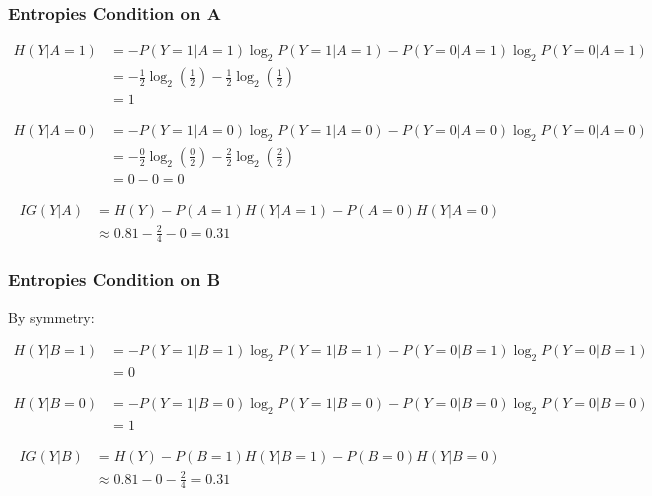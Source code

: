 \documentclass[aspectratio=169, 10pt]{beamer}
\begin{document}
\begin{frame}
\frametitle{Entropies Condition on A}
\small

\[
    \begin{split}
        H(Y | A=1) & = -P(Y=1 | A=1) \log_2 P(Y=1 | A=1) -P(Y=0 | A=1) \log_2 P(Y=0 | A=1) \\
                   & = -\frac{1}{2} \log_2(\frac{1}{2}) -\frac{1}{2} \log_2(\frac{1}{2}) \\
                   & = 1
    \end{split}
\]

\[
    \begin{split}
        H(Y | A=0) & = -P(Y=1 | A=0) \log_2 P(Y=1 | A=0) -P(Y=0 | A=0) \log_2 P(Y=0 | A=0) \\
                   & = -\frac{0}{2} \log_2(\frac{0}{2}) -\frac{2}{2} \log_2(\frac{2}{2}) \\
                   & = 0 - 0 = 0
    \end{split}
\]

\[
    \begin{split}
        IG(Y | A) & =  H(Y) - P(A=1)H(Y | A=1) - P(A=0)H(Y | A=0)\\
                  & \approx 0.81 - \frac{2}{4} - 0 = 0.31
    \end{split}
\]

\end{frame}

\begin{frame}
    \frametitle{Entropies Condition on B}
    \small
    
    By symmetry:

    \[
        \begin{split}
            H(Y | B=1) & = -P(Y=1 | B=1) \log_2 P(Y=1 | B=1) -P(Y=0 | B=1) \log_2 P(Y=0 | B=1) \\
                       & = 0
        \end{split}
    \]
    
    \[
        \begin{split}
            H(Y | B=0) & = -P(Y=1 | B=0) \log_2 P(Y=1 | B=0) -P(Y=0 | B=0) \log_2 P(Y=0 | B=0) \\
                       & = 1
        \end{split}
    \]
    
    \[
        \begin{split}
            IG(Y | B) & =  H(Y) - P(B=1)H(Y | B=1) - P(B=0)H(Y | B=0)\\
                      & \approx 0.81 - 0 - \frac{2}{4} = 0.31
        \end{split}
    \]
    
\end{frame}
\end{document}
